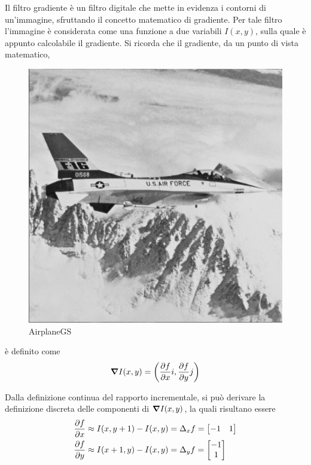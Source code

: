 \documentclass{subfiles}
\begin{document}
Il filtro gradiente è un filtro digitale che mette in evidenza i contorni di un'immagine, sfruttando il concetto matematico di gradiente.
Per tale filtro l'immagine è considerata come una funzione a due variabili \(I(x,y)\), sulla quale è appunto calcolabile il gradiente.
Si ricorda che il gradiente, da un punto di vista matematico,
\begin{figure}
    \centering
    \includegraphics[scale = 0.325]{../Images/Airplane/AirplaneGS.png}
    \caption{AirplaneGS}
    \label{fig:4.8}
\end{figure}
è definito come
\[
    \grad{I(x,y)} = \left(\pdv{f}{x} i, \pdv{f}{y} j\right)
\]

Dalla definizione continua del rapporto incrementale, si può derivare la definizione discreta delle componenti di \(\grad{I(x, y)}\), la quali risultano essere
\[\begin{aligned}
        \pdv{f}{x} & \approx I(x, y+1) - I(x, y) = \Delta_{x}f = \begin{bmatrix}
                                                                     -1 & 1 \\
                                                                 \end{bmatrix}   \\
        \pdv{f}{y} & \approx I(x + 1, y) - I(x, y) = \Delta_{y}f = \begin{bmatrix}
                                                                       -1 \\
                                                                       1  \\
                                                                   \end{bmatrix}
    \end{aligned}\]
\end{document}
